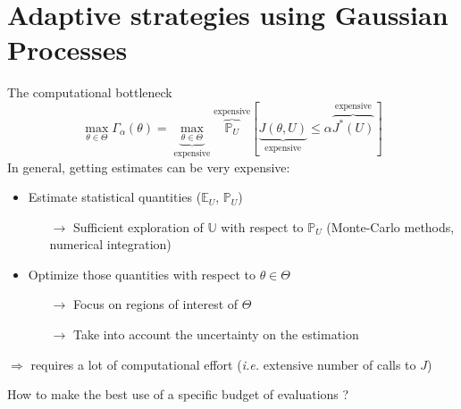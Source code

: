 \documentclass[10pt,aspectratio=169,usepdftitle=false]{beamer}
\newcommand{\Uspace}{\mathbb{U}}
\newcommand{\Kspace}{\Theta}
\newcommand{\Ex}{\mathbb{E}}
\newcommand{\Prob}{\mathbb{P}}
\newcommand{\kk}{\theta}
\newcommand{\UU}{U}
\begin{document}
\section{Adaptive strategies using Gaussian Processes}
\begin{frame}{The computational bottleneck}
  \begin{equation}
  \max_{\kk\in\Kspace}\Gamma_{\alpha}(\kk) = \underbrace{\max_{\kk\in\Kspace}}_{\text{expensive}}\overbrace{\Prob_{\UU}}^{\text{expensive}}[\underbrace{J(\kk, \UU)}_{\text{expensive}} \leq \alpha \overbrace{J^*(\UU)}^{\text{expensive}}]
\end{equation}
  In general, getting estimates can be very expensive:
  \begin{itemize}
  \item \alert{Estimate} statistical quantities ($\Ex_{\UU}$, $\Prob_{\UU}$)
    \begin{itemize}
    \item[$\rightarrow$] Sufficient exploration of $\Uspace$ with
      respect to $\Prob_{\UU}$ (Monte-Carlo methods, numerical
      integration)
 \end{itemize}
\item \alert{Optimize} those quantities with respect to $\kk\in\Kspace$
  \begin{itemize}
  \item[$\rightarrow$] Focus on regions of interest of $\Kspace$
  \item[$\rightarrow$] Take into account the uncertainty on the estimation
  \end{itemize}
    \end{itemize}
    $\Rightarrow$ requires a lot of computational effort (\emph{i.e.} extensive number of calls to $J$)

    How to make the best use of a specific budget of evaluations ?
\end{frame}
\end{document}
